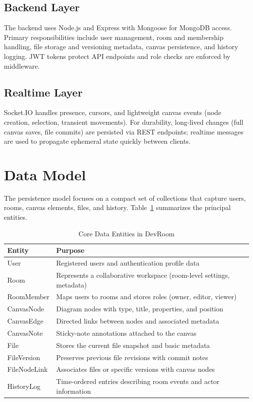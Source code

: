 \documentclass[conference]{IEEEtran}
\begin{document}
\subsection{Backend Layer}
The backend uses Node.js and Express with Mongoose for MongoDB access. Primary responsibilities include user management, room and membership handling, file storage and versioning metadata, canvas persistence, and history logging. JWT tokens protect API endpoints and role checks are enforced by middleware.

\subsection{Realtime Layer}
Socket.IO handles presence, cursors, and lightweight canvas events (node creation, selection, transient movements). For durability, long-lived changes (full canvas saves, file commits) are persisted via REST endpoints; realtime messages are used to propagate ephemeral state quickly between clients.

\section{Data Model}
The persistence model focuses on a compact set of collections that capture users, rooms, canvas elements, files, and history. Table~\ref{tab:data-model} summarizes the principal entities.

\begin{table}[htbp]
\caption{Core Data Entities in DevRoom}
\label{tab:data-model}
\centering
\begin{tabular}{>{\raggedright\arraybackslash}p{2.2cm} >{\raggedright\arraybackslash}p{5.0cm}}
\toprule
Entity & Purpose \\
\midrule
User & Registered users and authentication profile data \\
Room & Represents a collaborative workspace (room-level settings, metadata) \\
RoomMember & Maps users to rooms and stores roles (owner, editor, viewer) \\
CanvasNode & Diagram nodes with type, title, properties, and position \\
CanvasEdge & Directed links between nodes and associated metadata \\
CanvasNote & Sticky-note annotations attached to the canvas \\
File & Stores the current file snapshot and basic metadata \\
FileVersion & Preserves previous file revisions with commit notes \\
FileNodeLink & Associates files or specific versions with canvas nodes \\
HistoryLog & Time-ordered entries describing room events and actor information \\
\bottomrule
\end{tabular}
\end{table}
\end{document}
